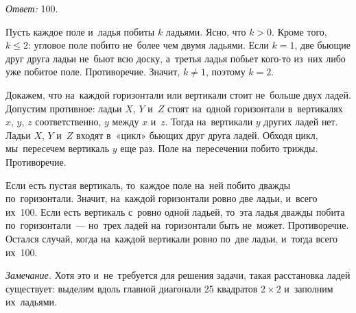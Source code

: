 \ifincludesolutions
\emph{Ответ:} 100.
\par
Пусть каждое поле и~ладья побиты $k$ ладьями.
Ясно, что $k > 0$.
Кроме того, $k \leq 2$: угловое поле побито не~более чем двумя ладьями.
Если $k = 1$, две бьющие друг друга ладьи не~бьют всю доску, а~третья ладья
побьет кого-то из~них либо уже побитое поле.
Противоречие.
Значит, $k \neq 1$, поэтому $k = 2$.
\par
Докажем, что на~каждой горизонтали или вертикали стоит не~больше двух ладей.
Допустим противное: ладьи $X$, $Y$ и~$Z$ стоят на~одной горизонтали
в~вертикалях $x$, $y$, $z$ соответственно, $y$ между $x$ и~$z$.
Тогда на~вертикали $y$ других ладей нет.
Ладьи $X$, $Y$ и~$Z$ входят в~«цикл» бьющих друг друга ладей.
Обходя цикл, мы~пересечем вертикаль $y$ еще раз.
Поле на~пересечении побито трижды.
Противоречие.
\par
Если есть пустая вертикаль, то~каждое поле на~ней побито дважды по~горизонтали.
Значит, на~каждой горизонтали ровно две ладьи, и~всего их~100.
Если есть вертикаль с~ровно одной ладьей, то~эта ладья дважды побита
по~горизонтали~— но~трех ладей на~горизонтали быть не~может.
Противоречие.
Остался случай, когда на~каждой вертикали ровно по~две ладьи, и~тогда всего
их~100.
\par
\emph{Замечание.}
Хотя это и~не~требуется для решения задачи, такая расстановка ладей существует:
выделим вдоль главной диагонали 25 квадратов $2 \times 2$ и~заполним
их~ладьями.
\fi %

\endgroup %

